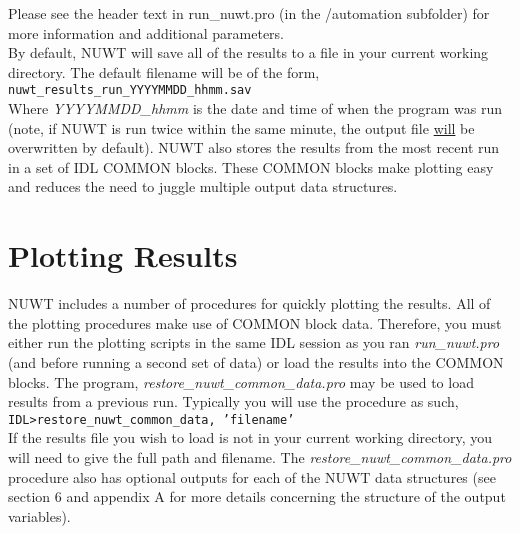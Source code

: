 \documentclass{article}
\begin{document}
Please see the header text in run\_nuwt.pro (in the /automation subfolder) for more information and additional parameters. \\

By default, NUWT will save all of the results to a file in your current working directory. The default filename will be of the form, \\

\hspace{0.5cm} \texttt{nuwt\_results\_run\_YYYYMMDD\_hhmm.sav} \\

Where \textit{YYYYMMDD\_hhmm} is the date and time of when the program was run (note, if NUWT is run twice within the same minute, the output file \underline{will} be overwritten by default). NUWT also stores the results from the most recent run in a set of IDL COMMON blocks. These COMMON blocks make plotting easy and reduces the need to juggle multiple output data structures. 


\section{Plotting Results}
NUWT includes a number of procedures for quickly plotting the results. All of the plotting procedures make use of COMMON block data. Therefore, you must either run the plotting scripts in the same IDL session as you ran \textit{run\_nuwt.pro} (and before running a second set of data) or load the results into the COMMON blocks. The program, \textit{restore\_nuwt\_common\_data.pro} may be used to load results from a previous run. Typically you will use the procedure as such, \\

\hspace{0.5cm} \texttt{IDL\textgreater restore\_nuwt\_common\_data, 'filename'} \\
	
If the results file you wish to load is not in your current working directory, you will need to give the full path and filename. The \textit{restore\_nuwt\_common\_data.pro} procedure also has optional outputs for each of the NUWT data structures (see section 6 and appendix A for more details concerning the structure of the output variables). \\
\end{document}

